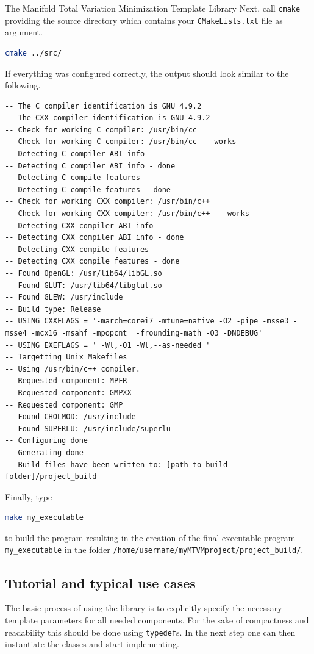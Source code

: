 \begin{chapter}{The Manifold Total Variation Minimization Template Library}
Next, call \texttt{cmake} providing the source directory which contains your \texttt{CMakeLists.txt} file as argument.
\begin{lstlisting}[language=bash]
cmake ../src/
\end{lstlisting}

If everything was configured correctly, the output should look similar to the following.\\
\begin{lstlisting}
-- The C compiler identification is GNU 4.9.2
-- The CXX compiler identification is GNU 4.9.2
-- Check for working C compiler: /usr/bin/cc
-- Check for working C compiler: /usr/bin/cc -- works
-- Detecting C compiler ABI info
-- Detecting C compiler ABI info - done
-- Detecting C compile features
-- Detecting C compile features - done
-- Check for working CXX compiler: /usr/bin/c++
-- Check for working CXX compiler: /usr/bin/c++ -- works
-- Detecting CXX compiler ABI info
-- Detecting CXX compiler ABI info - done
-- Detecting CXX compile features
-- Detecting CXX compile features - done
-- Found OpenGL: /usr/lib64/libGL.so  
-- Found GLUT: /usr/lib64/libglut.so  
-- Found GLEW: /usr/include  
-- Build type: Release
-- USING CXXFLAGS = '-march=corei7 -mtune=native -O2 -pipe -msse3 -msse4 -mcx16 -msahf -mpopcnt  -frounding-math -O3 -DNDEBUG'
-- USING EXEFLAGS = ' -Wl,-O1 -Wl,--as-needed '
-- Targetting Unix Makefiles
-- Using /usr/bin/c++ compiler.
-- Requested component: MPFR
-- Requested component: GMPXX
-- Requested component: GMP
-- Found CHOLMOD: /usr/include  
-- Found SUPERLU: /usr/include/superlu  
-- Configuring done
-- Generating done
-- Build files have been written to: [path-to-build-folder]/project_build
\end{lstlisting}

Finally, type
\begin{lstlisting}[language=bash]
make my_executable
\end{lstlisting}
to build the program resulting in the creation of the final executable program \texttt{my\_executable} in the folder \texttt{/home/username/myMTVMproject/project\_build/}.


\subsection{Tutorial and typical use cases} %
\label{sub:tutorial}
The basic process of using the library is to explicitly specify the necessary template parameters for all needed components. 
For the sake of compactness and readability this should be done using \texttt{typedef}s. In the next step one can then
instantiate the classes and start implementing.\\


\end{chapter}
